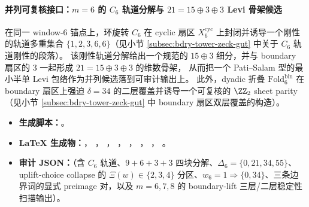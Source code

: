 \paragraph{并列可复核接口：\(m=6\) 的 \texorpdfstring{$C_6$}{C6} 轨道分解与 \texorpdfstring{$21=15\oplus 3\oplus 3$}{21=15+3+3} Levi 骨架候选}
在同一 window-6 锚点上，环旋转 \(C_6\) 在 cyclic 扇区 \(X_6^{\mathrm{cyc}}\) 上封闭并诱导一个刚性的轨道多重集合 \(\{1,2,3,6,6\}\)（见小节 \ref{subsec:bdry-tower-zeck-gut} 中关于 \texorpdfstring{$C_6$}{C6} 轨道刚性的段落）。
该刚性轨道分解给出一个规范的 \(15\oplus 3\) 细分，并与 boundary 扇区的 \(3\) 一起形成 \(21=15\oplus 3\oplus 3\) 的维数骨架，
从而把一个 Pati--Salam 型的最小半单 Levi 包络作为并列候选落到可审计输出上。
此外，dyadic 折叠 \(\mathrm{Fold}^{\mathrm{bin}}_6\) 在 boundary 扇区上强迫 \(\delta=34\) 的二层覆盖并诱导一个可复核的 \(\ZZ_2\) sheet parity（见小节 \ref{subsec:bdry-tower-zeck-gut} 中 boundary 扇区双层覆盖的构造）。
\begin{itemize}
  \item \textbf{生成脚本：}\texttt{}。
  \item \textbf{LaTeX 生成物：}\texttt{}，
  \texttt{}，
  \texttt{}，
  \texttt{}，
  \texttt{}，
  \texttt{}，
  \texttt{}，
  \texttt{}。
  \item \textbf{审计 JSON：}\texttt{}（含 \(C_6\) 轨道、\(9+6+3+3\) 四块分解、\(\Delta_6=\{0,21,34,55\}\)、uplift-choice collapse 的 \(\Xi(w)\in\{2,3,4\}\) 分区、\(w_6=1\Rightarrow\{0,34\}\)、三条边界词的显式 preimage 对，以及 \(m=6,7,8\) 的 boundary-lift 三层/二层稳定性扫描输出）。
\end{itemize}

